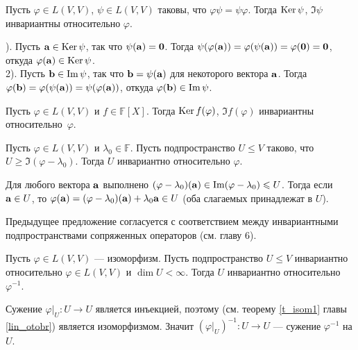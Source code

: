 
\begin{predl}\label{p8_5_2}
Пусть $\varphi \in L(V,V)$,  $\psi \in L(V,V)$ таковы, что $\varphi  \psi =  \psi \varphi$.
Тогда $\mathop{\rm Ker}\nolimits \psi$, $\Im \psi$ инвариантны относительно $\varphi$.
\end{predl}
).  Пусть $\mathbf{a}\in \mathop{\rm Ker}\nolimits \psi$, так что $\psi (\mathbf{a}) = \mathbf{0}$.
Тогда $\psi (\varphi (\mathbf{a})) = \varphi (\psi (\mathbf{a}))  = \varphi (\mathbf{0}) = \mathbf{0}$, 
откуда $\varphi ( \mathbf{a} )\in \mathop{\rm Ker}\nolimits \psi$.\\
2). Пусть $\mathbf{b}\in \mathop{\rm Im}\nolimits \psi$, так что $\mathbf{b} = \psi (\mathbf{a})$ для некоторого вектора $\mathbf{a}$.
Тогда $\varphi ( \mathbf{b} ) = \varphi ( \psi (\mathbf{a})) = \psi (\varphi  (\mathbf{a})) $, 
откуда $\varphi ( \mathbf{b} )\in \mathop{\rm Im}\nolimits \psi$.
\edok

\begin{sled}\label{p8_5_222}
Пусть $\varphi \in L(V,V)$ и $f\in \mathbb{F}[X]$.
Тогда $\mathop{\rm Ker}\nolimits f(\varphi)$, $\Im  f(\varphi)$ инвариантны относительно~$\varphi$.
\end{sled}

\begin{predl}\label{p8_5_3}
Пусть $\varphi \in L(V,V)$ и $\lambda_0 \in \mathbb{F}$.
Пусть подпространство
$U\leq  V$ таково, что $U \geq \Im (\varphi - \lambda _0)$.
Тогда $U$ инвариантно относительно $\varphi$.
\end{predl}
\dok Для любого вектора $\mathbf{a}$ 
выполнено  $(\varphi - \lambda _0)(\mathbf{a}) \in \mathop{\rm Im}\nolimits (\varphi - \lambda _0)\leqslant U$.
Тогда если $\mathbf{a}\in U$, то $\varphi (\mathbf{a}) = (\varphi - \lambda _0)(\mathbf{a}) + \lambda _0 \mathbf{a} \in U$
(оба слагаемых принадлежат в $U$).
\edok

\otstup

Предыдущее предложение согласуется с соответствием между инвариантными 
подпространствами сопряженных операторов (см. главу 6).


\begin{predl}\label{p8_5_4}
Пусть $\varphi \in L(V,V)$ --- изоморфизм. 
Пусть подпространство $U\leq V$ инвариантно относительно $\varphi \in L(V,V)$ и $\dim U<\infty $.
Тогда $U$ инвариантно относительно $\varphi ^{-1}$.
\end{predl}
\dok Сужение $\varphi|_U: U\to U$ является инъекцией, поэтому (см. теорему \ref{t_isom1} главы
\ref{lin_otobr}) является изоморфизмом. Значит  $(\varphi|_U)^{-1}: U\to U$ --- сужение $\varphi ^{-1}$ на $U$.
\edok

